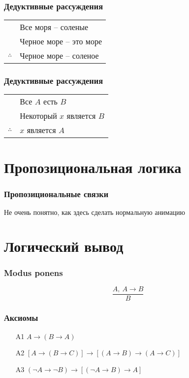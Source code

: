 \documentclass[24pt,pdf,hyperref={unicode}]{beamer}
\begin{document}
\begin{frame}\frametitle{Дедуктивные рассуждения}
\begin{tabular}{l l}
 & Все моря -- соленые \\
 & Черное море -- это море \\
 \hline
$\therefore$ & Черное море -- соленое \\
\end{tabular}
\end{frame}

\begin{frame}\frametitle{Дедуктивные рассуждения}
\begin{tabular}{l l}
 & Все $A$ есть $B$\\
 & Некоторый $x$ является $B$\\
 \hline
$\therefore$ & $x$ является $A$ \\
\end{tabular}
\end{frame}

\section{Пропозициональная логика}

\begin{frame}\frametitle{Пропозициональные связки }
Не очень понятно, как здесь сделать нормальную анимацию
\end{frame}

\section{Логический вывод}

\begin{frame}\frametitle{Modus ponens}
{\huge
$$
\frac{A,\ A\rightarrow B}{B}
$$
}
\end{frame}

\begin{frame}\frametitle{Аксиомы}
\begin{enumerate}
 \item[A1] $A\rightarrow(B\rightarrow A)$
 \item[A2] $\left[A\rightarrow(B\rightarrow C)\right]\rightarrow\left[(A\rightarrow B)\rightarrow(A\rightarrow C)\right]$
 \item[A3] $(\neg A\rightarrow \neg B)\rightarrow\left[(\neg A\rightarrow B)\rightarrow A\right]$
\end{enumerate}
\end{frame}
\end{document}
